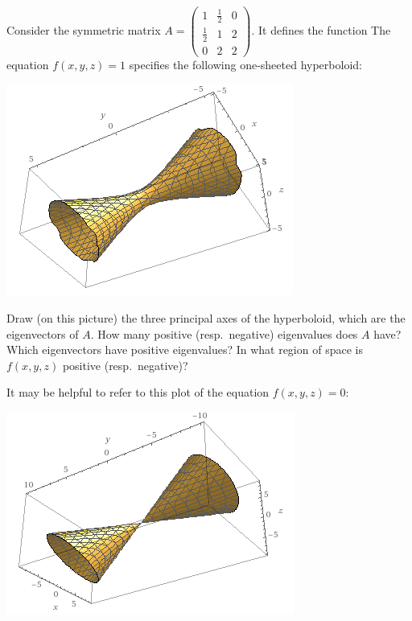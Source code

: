 \documentclass[10pt]{amsart}
\theoremstyle{mythm}
\theoremstyle{definition}
\theoremstyle{myrmk}
\begin{document}
	Consider the symmetric matrix $A = \begin{pmatrix}
	1 & \frac12 & 0 \\
	\frac12 & 1 & 2 \\
	0 & 2 & 2
	\end{pmatrix}$. It defines the function 
	The equation $f(x, y, z) = 1$ specifies the following one-sheeted hyperboloid: 
	\begin{center}
		\includegraphics{rec10-pic5}
	\end{center}
	Draw (on this picture) the three principal axes of the hyperboloid, which are the eigenvectors of $A$. How many positive (resp.\ negative) eigenvalues does $A$ have? Which eigenvectors have positive eigenvalues? In what region of space is $f(x, y, z)$ positive (resp.\ negative)? 
	
	It may be helpful to refer to this plot of the equation $f(x, y, z) = 0$: 
	
	\begin{center}
		\includegraphics{rec10-pic8}
	\end{center}
	
\end{document}
